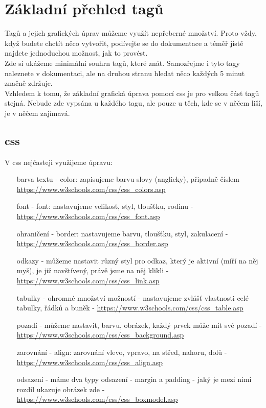 \section{Základní přehled tagů}
Tagů a jejich grafických úprav můžeme využít nepřeberné množství. Proto vždy, když budete chctít něco vytvořit, podívejte se do dokumentace a téměř jistě najdete jednoduchou možnost, jak to provést.\\
Zde si ukážeme minimální souhrn tagů, které  znát. Samozřejme i tyto tagy naleznete v dokumentaci, ale na druhou stranu hledat něco každých 5 minut značně zdržuje.\\
\vspace{1cm}
Vzhledem k tomu, že základní grafická úprava pomocí css je pro velkou část tagů stejná. Nebude zde vypsána u každého tagu, ale pouze u těch, kde se v něčem liší, je v něčem zajímavá.
\subsection{css}
V css nejčasteji využijeme úpravu:
\begin{itemize}
\item[barva textu - ] color: zapisujeme barvu slovy (anglicky), připadně číslem \url{https://www.w3schools.com/css/css_colors.asp}
\item[font - ] font: nastavujeme velikost, styl, tloušťku, rodinu  - \url{https://www.w3schools.com/css/css_font.asp}
\item[ohraničení - ] border: nastavujeme barvu, tloušťku, styl, zakulacení - \url{https://www.w3schools.com/css/css_border.asp}
\item[odkazy - ] můžeme nastavit různý styl pro odkaz, který je aktivní (míří na něj myš), je již navštívený, právě jsme na něj klikli - \url{https://www.w3schools.com/css/css_link.asp} 
\item[tabulky - ] ohromné množství možností - nastavujeme zvlášť vlastnosti celé tabulky, řádků a buněk - \url{https://www.w3schools.com/css/css_table.asp}
\item[pozadí - ] můžeme nastavit, barvu, obrázek, každý prvek může mít své pozadí - \url{https://www.w3schools.com/css/css_background.asp}
\item[zarovnání - ] align: zarovnání vlevo, vpravo, na střed, nahoru, dolů - \url{https://www.w3schools.com/css/css_align.asp}
\item[odsazení - ] máme dva typy odsazení - margin a padding - jaký je mezi nimi rozdíl ukazuje obrázek zde - \url{https://www.w3schools.com/css/css_boxmodel.asp}
\end{itemize}

